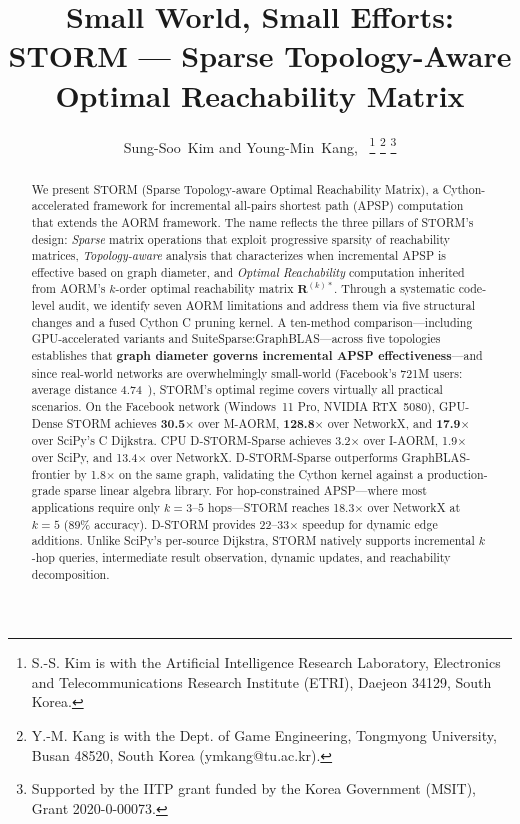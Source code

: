 \documentclass[journal]{IEEEtran}
\begin{document}
\title{Small World, Small Efforts:\\STORM --- Sparse Topology-Aware Optimal Reachability Matrix}

\author{Sung-Soo~Kim and Young-Min~Kang,~
\thanks{S.-S. Kim is with the Artificial Intelligence Research Laboratory, Electronics and Telecommunications Research Institute (ETRI), Daejeon 34129, South Korea.}
\thanks{Y.-M. Kang is with the Dept. of Game Engineering, Tongmyong University, Busan 48520, South Korea (ymkang@tu.ac.kr).}
\thanks{Supported by the IITP grant funded by the Korea Government (MSIT), Grant 2020-0-00073.}}

\maketitle

\begin{abstract}
We present STORM (Sparse Topology-aware Optimal Reachability Matrix), a Cython-accelerated framework for incremental all-pairs shortest path (APSP) computation that extends the AORM framework. The name reflects the three pillars of STORM's design: \emph{Sparse} matrix operations that exploit progressive sparsity of reachability matrices, \emph{Topology-aware} analysis that characterizes when incremental APSP is effective based on graph diameter, and \emph{Optimal Reachability} computation inherited from AORM's $k$-order optimal reachability matrix $\mathbf{R}^{(k)*}$. Through a systematic code-level audit, we identify seven AORM limitations and address them via five structural changes and a fused Cython C pruning kernel. A ten-method comparison---including GPU-accelerated variants and SuiteSparse:GraphBLAS---across five topologies establishes that \textbf{graph diameter governs incremental APSP effectiveness}---and since real-world networks are overwhelmingly small-world (Facebook's 721M users: average distance 4.74~\cite{backstrom2012}), STORM's optimal regime covers virtually all practical scenarios. On the Facebook network (Windows~11 Pro, NVIDIA RTX~5080), GPU-Dense STORM achieves \textbf{30.5$\times$} over M-AORM, \textbf{128.8$\times$} over NetworkX, and \textbf{17.9$\times$} over SciPy's C Dijkstra. CPU D-STORM-Sparse achieves 3.2$\times$ over I-AORM, 1.9$\times$ over SciPy, and 13.4$\times$ over NetworkX. D-STORM-Sparse outperforms GraphBLAS-frontier by 1.8$\times$ on the same graph, validating the Cython kernel against a production-grade sparse linear algebra library. For hop-constrained APSP---where most applications require only $k=3$--$5$ hops---STORM reaches 18.3$\times$ over NetworkX at $k\!=\!5$ (89\% accuracy). D-STORM provides 22--33$\times$ speedup for dynamic edge additions. Unlike SciPy's per-source Dijkstra, STORM natively supports incremental $k$-hop queries, intermediate result observation, dynamic updates, and reachability decomposition.
\end{abstract}
\end{document}
